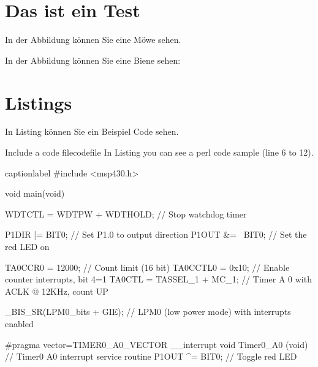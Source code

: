 \chapter{Das ist ein Test}

In der Abbildung  können Sie eine Möwe sehen.


In der Abbildung  können Sie eine Biene sehen:


\chapter{Listings}

In Listing  können Sie ein Beispiel Code sehen.


\begin{code}[tex]{Include a code file}{codefile}
In Listing  you can see a perl code sample (line 6 to 12).
\end{code}

\begin{code}[c]{caption}{label}
#include <msp430.h> 

void main(void) {
	WDTCTL = WDTPW + WDTHOLD; // Stop watchdog timer

	P1DIR |= BIT0; // Set P1.0 to output direction
	P1OUT &= ~BIT0; // Set the red LED on

	TA0CCR0 = 12000; // Count limit (16 bit)
	TA0CCTL0 = 0x10;	 // Enable counter interrupts, bit 4=1
	TA0CTL = TASSEL_1 + MC_1; // Timer A 0 with ACLK @ 12KHz, count UP

	_BIS_SR(LPM0_bits + GIE); // LPM0 (low power mode) with interrupts enabled
}

#pragma vector=TIMER0_A0_VECTOR
   __interrupt void Timer0_A0 (void) { // Timer0 A0 interrupt service routine
	P1OUT ^= BIT0; // Toggle red LED
}
\end{code}


